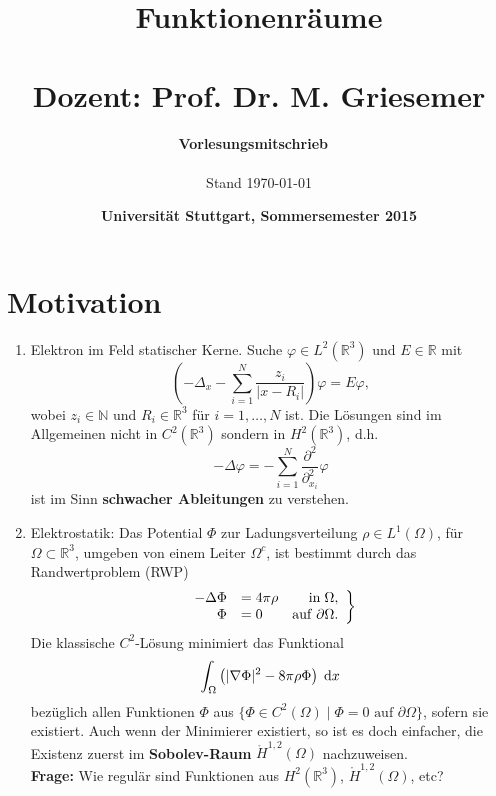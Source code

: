 \documentclass[
paper=a4,
bibtotocnumbered,
liststotocnumbered,
tablecaptionabove,
pointlessnumbers,
twoside,
openright,
10pt
]
{report}
\title{\fontsize{35pt}{60pt}\selectfont\color{dblue} Funktionenräume \\ \ \\ \Large \textbf{Dozent: } Prof. Dr. M. Griesemer}
\author{\color{dkgray}\textbf{Vorlesungsmitschrieb} \ \\ \ \\\small{\color{dkgray}Stand \today}}
\date{\Large\color{dkgray}\textbf{Universität Stuttgart, Sommersemester 2015}}
\let\phi\varphi
\theoremstyle{definition}
\numberwithin{equation}{chapter}
\begin{document}
\maketitle
{\hypersetup{hidelinks}
\tableofcontents
}
\newpage

\section*{Motivation}
\begin{enumerate}[\bf 1)]
\item Elektron im Feld statischer Kerne. Suche $\phi\in L^2(\mathbb{R}^3)$ und $E\in\mathbb{R}$ mit
\begin{equation}
\left(-\Delta_x-\sum_{i=1}^N \frac{z_i}{|x-R_i|}\right)\phi = E\phi,
\end{equation}
wobei $z_i\in\mathbb{N}$ und $R_i\in\mathbb{R}^3$ für $i=1,\ldots,N$ ist. Die Lösungen sind im Allgemeinen nicht in $C^2(\mathbb{R}^3)$ sondern in $H^2(\mathbb{R}^3)$, d.h.
\begin{equation}
-\Delta\phi = -\sum_{i=1}^N \frac{\partial^2}{\partial_{x_i}^2}\phi
\end{equation}
ist im Sinn \textbf{schwacher Ableitungen} zu verstehen.
\item Elektrostatik: Das Potential $\Phi$ zur Ladungsverteilung $\rho\in L^1(\Omega)$, für $\Omega\subset\mathbb{R}^3$, umgeben von einem Leiter $\Omega^c$, ist bestimmt durch das Randwertproblem (RWP)
\begin{align}
\left.
\begin{array}{r l r}
-\Delta\Phi &= 4\pi\rho &\mathrm{in}\;\Omega, \\
\Phi &= 0 &\mathrm{auf}\;\partial\Omega.
\end{array}
\right\}
\end{align}
Die klassische $C^2$-Lösung minimiert das Funktional
\begin{equation}
\int_\Omega \left(|\nabla\Phi|^2 -8\pi\rho\Phi\right)\;\mathrm{d} x
\end{equation}
bezüglich allen Funktionen $\Phi$ aus $\{\Phi\in C^2(\Omega)\mid \Phi=0\text{ auf }\partial\Omega\}$, sofern sie existiert. Auch wenn der Minimierer existiert, so ist es doch einfacher, die Existenz zuerst im \textbf{Sobolev-Raum} $\mathring H^{1,2}(\Omega)$ nachzuweisen.\\
\textbf{Frage:} Wie regulär sind Funktionen aus $H^2(\mathbb{R}^3)$, $\mathring H^{1,2}(\Omega)$, etc?
\end{enumerate}
\end{document}

